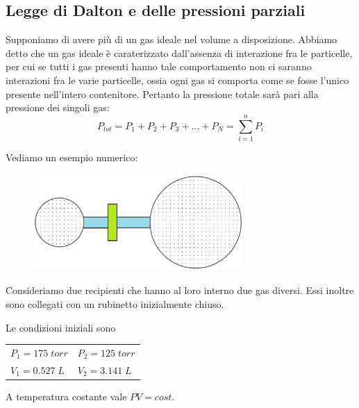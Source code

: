 \subsection{Legge di Dalton e delle pressioni parziali}
Supponiamo di avere più di un gas ideale nel volume a disposizione. Abbiamo detto che un gas ideale è caraterizzato dall'assenza di interazione fra le particelle, per cui se tutti i gas presenti hanno tale comportamento non ci saranno interazioni fra le varie particelle, ossia ogni gas si comporta come se fosse l'unico presente nell'intero contenitore. Pertanto la pressione totale sarà pari alla pressione dei singoli gas:
$$P_{tot}=P_1 + P_2 + P_3 + ... + P_N = \sum_{i=1}^nP_i$$

Vediamo un esempio numerico:

\vspace{-0.3cm}
\hspace{0.5cm}\begin{minipage}{0.55 \textwidth}
    \begin{figure}[H]
        \includegraphics[width=8cm]{immagini/serbatoio.png}
    \end{figure}
\end{minipage}
\begin{minipage}{0.4 \textwidth}
\vspace{0.8cm}Consideriamo due recipienti che hanno al loro interno due gas diversi. Essi inoltre sono collegati con un rubinetto inizialmente chiuso.

Le condizioni iniziali sono

\begin{center}
    \begin{tabular}{p{2.5cm}p{2.5cm}}
        $P_1=175 \; torr$ & $P_2=125 \; torr$\\[1ex]
        $V_1=0.527 \; L$ & $V_2=3.141 \; L$
    \end{tabular}
\end{center}
\end{minipage}

\vspace{0.4cm}A temperatura costante vale $PV=cost$.

